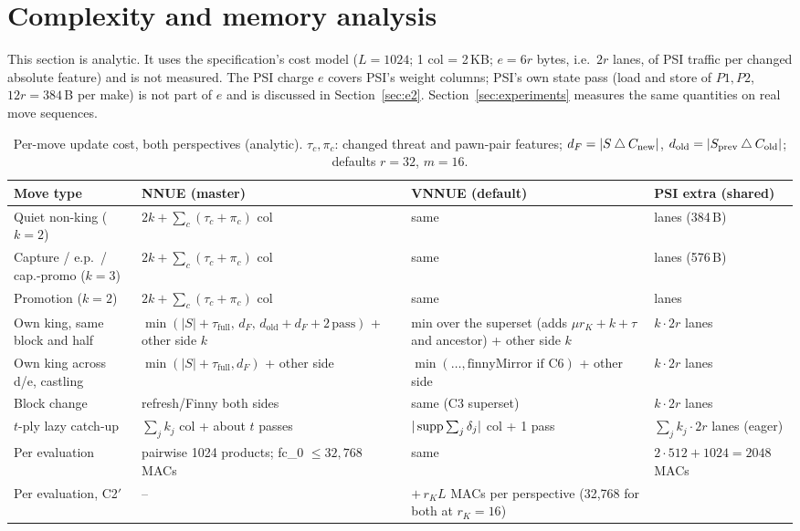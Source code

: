 \section{Complexity and memory analysis}\label{sec:complexity}

This section is analytic. It uses the specification's cost model ($L=1024$; 1 col = 2\,KB; $e=6r$ bytes, i.e.\ $2r$ lanes, of PSI traffic per changed absolute feature) and is not measured.
The PSI charge $e$ covers PSI's weight columns; PSI's own state pass (load and store of $P1,P2$, $12r=384$\,B per make) is not part of $e$ and is discussed in Section~\ref{sec:e2}.
Section~\ref{sec:experiments} measures the same quantities on real move sequences.

\begin{table}[htbp]
\centering\small
\caption{Per-move update cost, both perspectives (analytic). $\tau_c,\pi_c$: changed threat and pawn-pair features; $d_F=|S\mathbin{\triangle} C_{\text{new}}|$, $d_{\text{old}}=|S_{\text{prev}}\mathbin{\triangle} C_{\text{old}}|$; defaults $r=32$, $m=16$.}\label{tab:cost}
\begin{tabularx}{\linewidth}{@{}>{\raggedright}p{3.3cm}>{\raggedright}X>{\raggedright}X>{\raggedright\arraybackslash}p{2.7cm}@{}}
\toprule
Move type & NNUE (master) & VNNUE (default) & PSI extra (shared)\\
\midrule
Quiet non-king ($k=2$) & $2k+\sum_c(\tau_c+\pi_c)$ col & same & 128 lanes (384\,B)\\
Capture / e.p.\ / cap.-promo ($k=3$) & $2k+\sum_c(\tau_c+\pi_c)$ col & same & 192 lanes (576\,B)\\
Promotion ($k=2$) & $2k+\sum_c(\tau_c+\pi_c)$ col & same & 128 lanes\\
Own king, same block and half & $\min(|S|+\tau_{\text{full}},\,d_F,\,d_{\text{old}}+d_F+2\,\text{pass})$ + other side $k$ & min over the superset (adds $\mu r_K+k+\tau$ and ancestor) + other side $k$ & $k\cdot2r$ lanes\\
Own king across d/e, castling & $\min(|S|+\tau_{\text{full}},d_F)$ + other side & $\min(\dots,\text{finnyMirror if C6})$ + other side & $k\cdot2r$ lanes\\
Block change & refresh/Finny both sides & same (C3 superset) & $k\cdot2r$ lanes\\
$t$-ply lazy catch-up & $\sum_jk_j$ col + about $t$ passes & $|\operatorname{supp}\sum_j\delta_j|$ col + 1 pass & $\sum_jk_j\cdot2r$ lanes (eager)\\
\midrule
Per evaluation & pairwise 1024 products; fc\_0 $\le32{,}768$ MACs & same & $2\cdot512+1024=2048$ MACs\\
Per evaluation, C2$'$ & -- & $+\,r_KL$ MACs per perspective (32,768 for both at $r_K=16$) & \\
\bottomrule
\end{tabularx}
\end{table}

